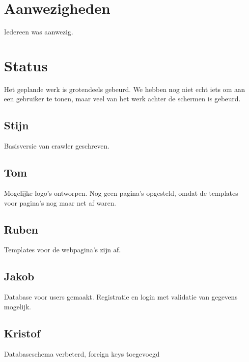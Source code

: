 \documentclass[11pt, a4paper]{article}
\begin{document}
\title{}
\author{Groep A\\ Week 3}
\date{27 februari 2014}
\maketitle

\section{Aanwezigheden}
Iedereen was aanwezig.
\section{Status}
Het geplande werk is grotendeels gebeurd. We hebben nog niet echt iets om aan een gebruiker te tonen, maar veel van het werk achter de schermen is gebeurd.
\subsection{Stijn}
Basisversie van crawler geschreven.
\subsection{Tom}
Mogelijke logo's ontworpen. Nog geen pagina's opgesteld, omdat de templates voor pagina's nog maar net af waren.
\subsection{Ruben}
Templates voor de webpagina's zijn af.
\subsection{Jakob}
Database voor users gemaakt. Registratie en login met validatie van gegevens mogelijk.
\subsection{Kristof}
Databaseschema verbeterd, foreign keys toegevoegd
\end{document}
